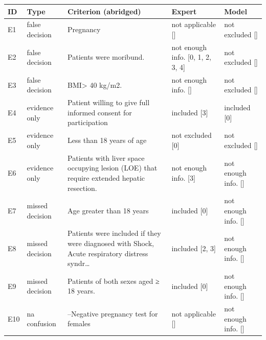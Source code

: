 \begin{tabular}{p{.05\linewidth}p{.15\linewidth}p{.32\linewidth}p{.13\linewidth}p{.13\linewidth}}\toprule
ID & Type & Criterion (abridged) & Expert & Model \\\midrule
E1 & false decision & Pregnancy & not applicable [] & not excluded [] \\
E2 & false decision & Patients were moribund. & not enough info. [0, 1, 2, 3, 4] & not excluded [] \\
E3 & false decision & BMI> 40 kg/m2. & not enough info. [] & not excluded [] \\
E4 & evidence only & Patient willing to give full informed consent for participation & included [3] & included [0] \\
E5 & evidence only & Less than 18 years of age & not excluded [0] & not excluded [] \\
E6 & evidence only & Patients with liver space occupying lesion (LOE) that require extended hepatic resection. & not enough info. [3] & not enough info. [] \\
E7 & missed decision & Age greater than 18 years & included [0] & not enough info. [] \\
E8 & missed decision & Patients were included if they were diagnosed with Shock, Acute respiratory distress syndr… & included [2, 3] & not enough info. [] \\
E9 & missed decision & Patients of both sexes aged ≥ 18 years. & included [0] & not enough info. [] \\
E10 & na confusion & --Negative pregnancy test for females & not applicable [] & not enough info. [] \\
\bottomrule\end{tabular}
